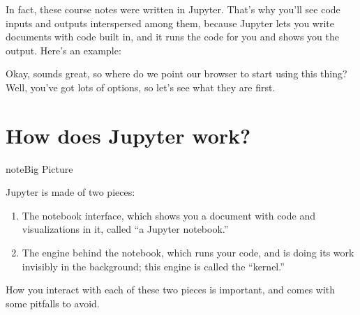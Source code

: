 \documentclass[letterpaper,10pt,english]{sphinxmanual}
\begin{document}
In fact, these course notes were written in Jupyter.  That’s why you’ll see code inputs and outputs interspersed among them, because Jupyter lets you write documents with code built in, and it runs the code for you and shows you the output.  Here’s an example:

\begin{sphinxVerbatim}[commandchars=\\\{\}]
   
 \PYG{p}{[}    \PYG{p}{]} 
\end{sphinxVerbatim}

\noindent{}

Okay, sounds great, so where do we point our browser to start using this thing?  Well, you’ve got lots of options, so let’s see what they are first.


\section{How does Jupyter work?}
\label{\detokenize{chapter-3-jupyter:how-does-jupyter-work}}
\begin{sphinxadmonition}{note}{Big Picture}

Jupyter is made of two pieces:
\begin{enumerate}
%
\item {} 
The notebook interface, which shows you a document with code and visualizations in it, called “a Jupyter notebook.”

\item {} 
The engine behind the notebook, which runs your code, and is doing its work invisibly in the background; this engine is called the “kernel.”

\end{enumerate}

How you interact with each of these two pieces is important, and comes with some pitfalls to avoid.
\end{sphinxadmonition}
\end{document}
